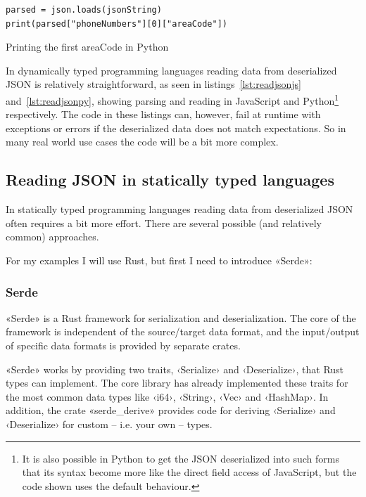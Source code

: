 \begin{listing}[ht!]
\begin{verbatim}
parsed = json.loads(jsonString)
print(parsed["phoneNumbers"][0]["areaCode"])
\end{verbatim}
\caption{Printing the first areaCode in Python}
\label{lst:readjsonpy}
\end{listing}

In dynamically typed programming languages reading data from deserialized JSON is relatively straightforward, as seen in listings~\ref{lst:readjsonjs} and~\ref{lst:readjsonpy}, showing parsing and reading in JavaScript and Python\footnote{It is also possible in Python to get the JSON deserialized into such forms that its syntax become more like the direct field access of JavaScript, but the code shown uses the default behaviour.} respectively. The code in these listings can, however, fail at runtime with exceptions or errors if the deserialized data does not match expectations. So in many real world use cases the code will be a bit more complex.

\subsection{Reading JSON in statically typed languages}

In statically typed programming languages reading data from deserialized JSON often requires a bit more effort. There are several possible (and relatively common) approaches.

For my examples I will use Rust, but first I need to introduce «Serde»:

\subsubsection{Serde}
\label{sec:serde}

«Serde»\cite{serde} is a Rust framework for serialization and deserialization. The core of the framework is independent of the source/target data format, and the input/output of specific data formats is provided by separate crates.

«Serde» works by providing two traits, ‹Serialize› and ‹Deserialize›, that Rust types can implement. The core library has already implemented these traits for the most common data types like ‹i64›, ‹String›, ‹Vec› and ‹HashMap›. In addition, the crate «serde_derive» provides code for deriving ‹Serialize› and ‹Deserialize› for custom -- i.e. your own -- types.

